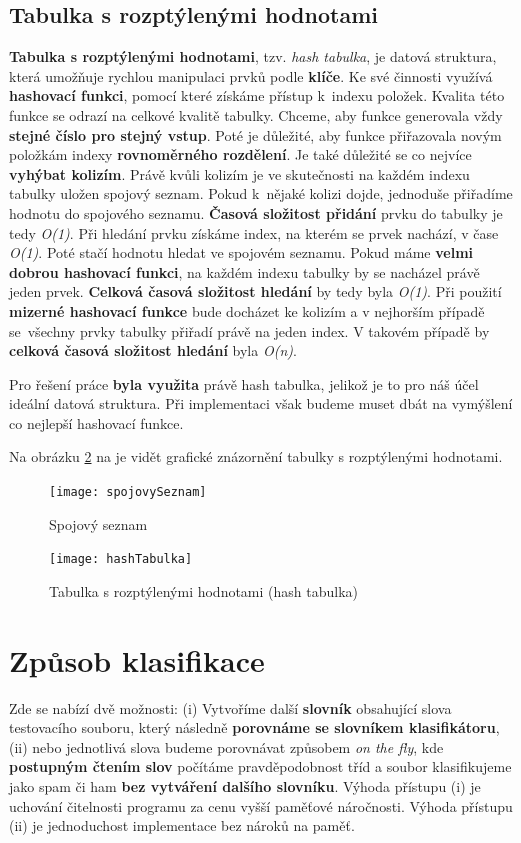 \documentclass[12pt]{report}
\begin{document}
		\subsection{Tabulka s rozptýlenými hodnotami}
		\textbf{Tabulka s rozptýlenými hodnotami}, tzv. \textit{hash tabulka}, je datová struktura, která umožňuje rychlou manipulaci prvků podle \textbf{klíče}. Ke své činnosti využívá \textbf{hashovací funkci}, pomocí které získáme přístup k~indexu položek. Kvalita této funkce se odrazí na celkové kvalitě tabulky. Chceme, aby funkce generovala vždy \textbf{stejné číslo pro stejný vstup}. Poté je důležité, aby funkce přiřazovala novým položkám indexy \textbf{rovnoměrného rozdělení}. Je také důležité se co nejvíce \textbf{vyhýbat kolizím}. Právě kvůli kolizím je ve skutečnosti na každém indexu tabulky uložen spojový seznam. Pokud k~nějaké kolizi dojde, jednoduše přiřadíme hodnotu do spojového seznamu. \textbf{Časová složitost přidání} prvku do tabulky je tedy \textit{O(1)}. Při hledání prvku získáme index, na kterém se prvek nachází, v čase \textit{O(1)}. Poté stačí hodnotu hledat ve spojovém seznamu. Pokud máme \textbf{velmi dobrou hashovací funkci}, na každém indexu tabulky by se nacházel právě jeden prvek. \textbf{Celková časová složitost hledání} by tedy byla \textit{O(1)}. Při použití \textbf{mizerné hashovací funkce} bude docházet ke kolizím a v nejhorším případě se~všechny prvky tabulky přiřadí právě na jeden index. V takovém případě by \textbf{celková časová složitost hledání} byla \textit{O(n)}.
		
		Pro řešení práce \textbf{byla využita} právě hash tabulka, jelikož je to pro náš účel ideální datová struktura. Při implementaci však budeme muset dbát na vymýšlení co nejlepší hashovací funkce.
		
		Na obrázku \ref{fig:hashTabulka} na je vidět grafické znázornění tabulky s rozptýlenými hodnotami.

		\begin{figure}
			\centering
			\texttt{[image: spojovySeznam]}
			\caption{Spojový seznam}
			\label{fig:spojovySeznam}
		\end{figure}

		\begin{figure}
			\centering
			\texttt{[image: hashTabulka]}
			\caption{Tabulka s rozptýlenými hodnotami (hash tabulka)}
			\label{fig:hashTabulka}
		\end{figure}
	
	\section{Způsob klasifikace}
	\label{klasifikace}
	Zde se nabízí dvě možnosti: (i) Vytvoříme další \textbf{slovník} obsahující slova testovacího souboru, který následně \textbf{porovnáme se slovníkem klasifikátoru}, (ii) nebo jednotlivá slova budeme porovnávat způsobem \textit{on the fly}, kde \textbf{postupným čtením slov} počítáme pravděpodobnost tříd a soubor klasifikujeme jako spam či ham \textbf{bez vytváření dalšího slovníku}. Výhoda přístupu (i) je uchování čitelnosti programu za cenu vyšší paměťové náročnosti. Výhoda přístupu (ii) je jednoduchost implementace bez nároků na paměť.
	
\end{document}
